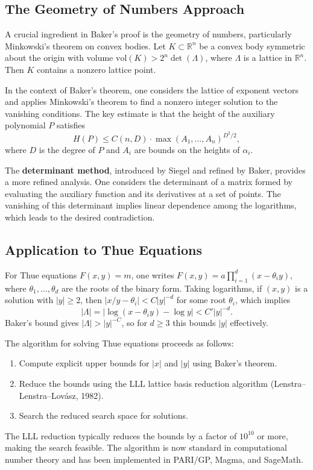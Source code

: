 \subsection*{The Geometry of Numbers Approach}

A crucial ingredient in Baker's proof is the geometry of numbers, particularly Minkowski's theorem on convex bodies. Let $K \subset \mathbb{R}^n$ be a convex body symmetric about the origin with volume $\text{vol}(K) > 2^n \det(\Lambda)$, where $\Lambda$ is a lattice in $\mathbb{R}^n$. Then $K$ contains a nonzero lattice point.

In the context of Baker's theorem, one considers the lattice of exponent vectors and applies Minkowski's theorem to find a nonzero integer solution to the vanishing conditions. The key estimate is that the height of the auxiliary polynomial $P$ satisfies
\[
H(P) \leq C(n, D) \cdot \max(A_1, \ldots, A_n)^{D^2/2},
\]
where $D$ is the degree of $P$ and $A_i$ are bounds on the heights of $\alpha_i$.

The \textbf{determinant method}, introduced by Siegel and refined by Baker, provides a more refined analysis. One considers the determinant of a matrix formed by evaluating the auxiliary function and its derivatives at a set of points. The vanishing of this determinant implies linear dependence among the logarithms, which leads to the desired contradiction.

\subsection*{Application to Thue Equations}

For Thue equations $F(x,y) = m$, one writes $F(x,y) = a \prod_{i=1}^d (x - \theta_i y)$, where $\theta_1, \ldots, \theta_d$ are the roots of the binary form. Taking logarithms, if $(x,y)$ is a solution with $|y| \geq 2$, then $|x/y - \theta_i| < C|y|^{-d}$ for some root $\theta_i$, which implies
\[
|\Lambda| = |\log(x - \theta_i y) - \log y| < C'|y|^{-d}.
\]
Baker's bound gives $|\Lambda| > |y|^{-C}$, so for $d \geq 3$ this bounds $|y|$ effectively.

The algorithm for solving Thue equations proceeds as follows:
\begin{enumerate}
    \item Compute explicit upper bounds for $|x|$ and $|y|$ using Baker's theorem.
    \item Reduce the bounds using the LLL lattice basis reduction algorithm (Lenstra--Lenstra--Lov\'asz, 1982).
    \item Search the reduced search space for solutions.
\end{enumerate}
The LLL reduction typically reduces the bounds by a factor of $10^{10}$ or more, making the search feasible. The algorithm is now standard in computational number theory and has been implemented in PARI/GP, Magma, and SageMath.

